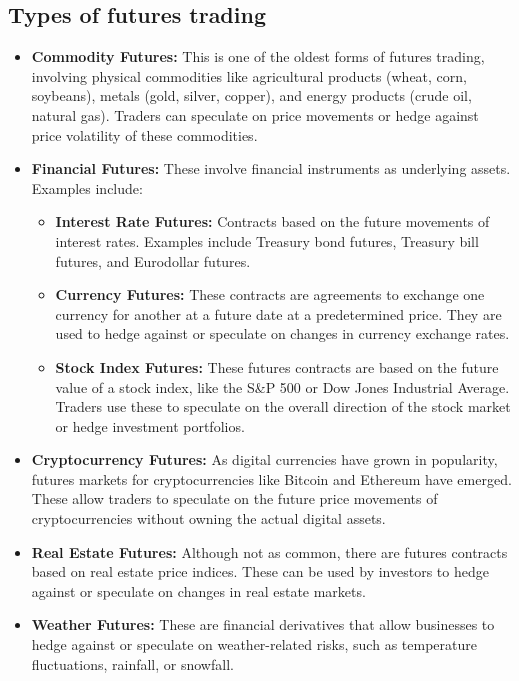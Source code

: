 \documentclass{report}
\begin{document}
    \bigbreak \noindent 
    \subsection{Types of futures trading}
    \bigbreak \noindent 
    \begin{itemize}
        \item \textbf{Commodity Futures:} This is one of the oldest forms of futures trading, involving physical commodities like agricultural products (wheat, corn, soybeans), metals (gold, silver, copper), and energy products (crude oil, natural gas). Traders can speculate on price movements or hedge against price volatility of these commodities.
        \item \textbf{Financial Futures:} These involve financial instruments as underlying assets. Examples include:
            \begin{itemize}
                \item \textbf{Interest Rate Futures:} Contracts based on the future movements of interest rates. Examples include Treasury bond futures, Treasury bill futures, and Eurodollar futures.
                \item \textbf{Currency Futures:} These contracts are agreements to exchange one currency for another at a future date at a predetermined price. They are used to hedge against or speculate on changes in currency exchange rates.
                \item \textbf{Stock Index Futures:} These futures contracts are based on the future value of a stock index, like the S\&P 500 or Dow Jones Industrial Average. Traders use these to speculate on the overall direction of the stock market or hedge investment portfolios.
            \end{itemize}
        \item \textbf{Cryptocurrency Futures:} As digital currencies have grown in popularity, futures markets for cryptocurrencies like Bitcoin and Ethereum have emerged. These allow traders to speculate on the future price movements of cryptocurrencies without owning the actual digital assets.
        \item \textbf{Real Estate Futures:} Although not as common, there are futures contracts based on real estate price indices. These can be used by investors to hedge against or speculate on changes in real estate markets.
        \item \textbf{Weather Futures:} These are financial derivatives that allow businesses to hedge against or speculate on weather-related risks, such as temperature fluctuations, rainfall, or snowfall.
    \end{itemize}
    \bigbreak \noindent 
\end{document}
